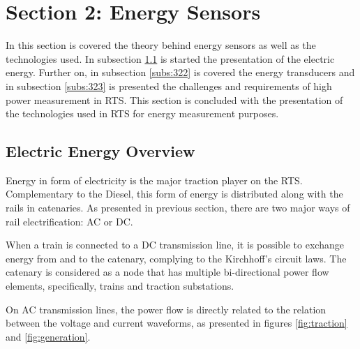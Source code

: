 


\section{Section 2: Energy Sensors}


In this section is covered the theory behind energy sensors as well as the technologies used. In subsection \ref{subs:321} is started the presentation of the electric energy. Further on, in subsection \ref{subs:322} is covered the energy transducers and in subsection \ref{subs:323} is presented the challenges and requirements of high power measurement in RTS. This section is concluded with the presentation of the technologies used in RTS for energy measurement purposes.

\subsection{Electric Energy Overview}
\label{subs:321}
Energy in form of electricity is the major traction player on the RTS. 
Complementary to the Diesel, this form of energy is distributed along with the rails in catenaries.
As presented in previous section, there are two major ways of rail electrification: AC or DC.

When a train is connected to a DC transmission line, it is possible to exchange energy from and to the catenary, complying to the Kirchhoff's circuit laws. The catenary is considered as a node that has multiple bi-directional power flow elements, specifically, trains and traction substations.

On AC transmission lines, the power flow is directly related to the relation between the voltage and current waveforms, as presented in figures \ref{fig:traction} and \ref{fig:generation}.

